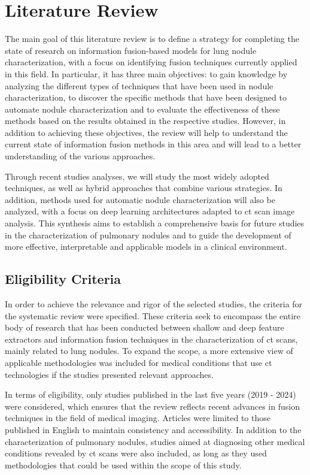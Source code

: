 \chapter{Literature Review} \label{chap:lreview}

The main goal of this literature review is to define a strategy for completing the state of research on information fusion-based models for lung nodule characterization, with a focus on identifying fusion techniques currently applied in this field. In particular, it has three main objectives: to gain knowledge by analyzing the different types of techniques that have been used in nodule characterization, to discover the specific methods that have been designed to automate nodule characterization and to evaluate the effectiveness of these methods based on the results obtained in the respective studies. However, in addition to achieving these objectives, the review will help to understand the current state of information fusion methods in this area and will lead to a better understanding of the various approaches.

Through recent studies analyses, we will study the most widely adopted techniques, as well as hybrid approaches that combine various strategies. In addition, methods used for automatic nodule characterization will also be analyzed, with a focus on deep learning architectures adapted to \ac{ct} scan image analysis. This synthesis aims to establish a comprehensive basis for future studies in the characterization of pulmonary nodules and to guide the development of more effective, interpretable and applicable models in a clinical environment.

\section{Eligibility Criteria} \label{criteria} 

In order to achieve the relevance and rigor of the selected studies, the criteria for the systematic review were specified. These criteria seek to encompass the entire body of research that has been conducted between shallow and deep feature extractors and information fusion techniques in the characterization of \ac{ct} scans, mainly related to lung nodules. To expand the scope, a more extensive view of applicable methodologies was included for medical conditions that use \ac{ct} technologies if the studies presented relevant approaches.

In terms of eligibility, only studies published in the last five years (2019 - 2024) were considered, which ensures that the review reflects recent advances in fusion techniques in the field of medical imaging. Articles were limited to those published in English to maintain consistency and accessibility. In addition to the characterization of pulmonary nodules, studies aimed at diagnosing other medical conditions revealed by \ac{ct} scans were also included, as long as they used methodologies that could be used within the scope of this study.

